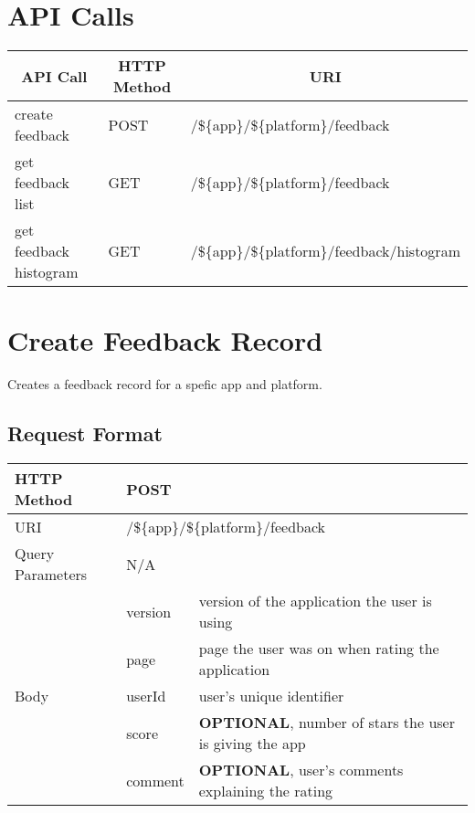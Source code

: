 
\section{API Calls}
\begin{center}
\begin{tabular}{|l||l||l|}
\hline

\multicolumn{1}{|c||}{\textbf{API Call}} &
\multicolumn{1}{c||}{\textbf{HTTP Method}} &
\multicolumn{1}{c|}{\textbf{URI}} \\

\hline
\hline
create feedback        & POST & /\$\{app\}/\$\{platform\}/feedback                   \\
\hline
get feedback list      & GET  & /\$\{app\}/\$\{platform\}/feedback                    \\
\hline
get feedback histogram & GET  & /\$\{app\}/\$\{platform\}/feedback/histogram \\
\hline
\end{tabular}
\end{center}


\section{Create Feedback Record}

Creates a feedback record for a spefic app and platform.

\subsection{Request Format}

\begin{center}
\begin{tabular}{|l||l|l|}
\hline

HTTP Method & \multicolumn{2}{l|}{POST}   \\

\hline
\hline
URI         & \multicolumn{2}{l|}{/\$\{app\}/\$\{platform\}/feedback} \\
\hline
\hline
Query Parameters & \multicolumn{2}{l|}{N/A}           \\
\hline
\hline
\multirow{5}{*}{Body} &
   version & version of the application the user is using \\
\cline{2-3}
& page & page the user was on when rating the application \\
\cline{2-3}
& userId & user's unique identifier \\
\cline{2-3}
& score & \textbf{OPTIONAL}, number of stars the user is giving the app \\
\cline{2-3}
& comment & \textbf{OPTIONAL}, user's comments explaining the rating \\

\hline
\end{tabular}
\end{center}


